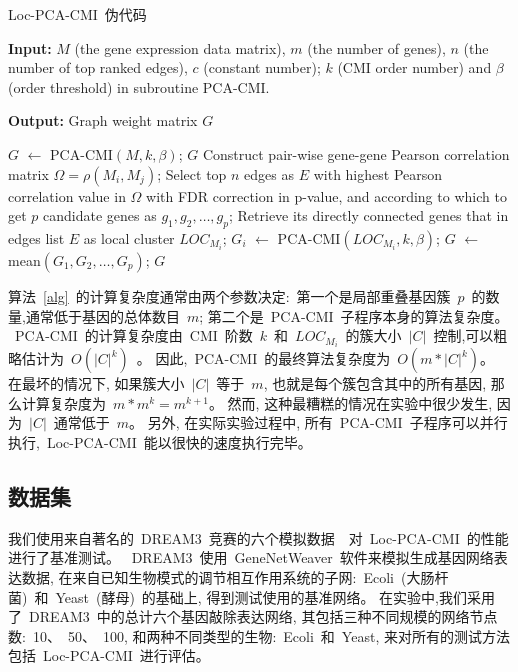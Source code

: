 \begin{algorithm}[!htbp]
    \caption{Loc-PCA-CMI~伪代码} %
    \label{alg}
    {\bf Input:} %
    $M$ (the gene expression data matrix), $m$ (the number of genes), $n$ (the number of top ranked edges), $c$ (constant number); $k$ (CMI order number) and $\beta$ (order threshold) in subroutine PCA-CMI.
    
    {\bf Output:} %
    Graph weight matrix $G$ 
    \begin{algorithmic}[1]
    \State $G$ $\leftarrow$ PCA-CMI$(M, k, \beta)$;
    \State \Return $G$
    \Else
    \State Construct pair-wise gene-gene Pearson correlation matrix $\Omega = \rho(M_i, M_j)$;
    \State Select top $n$ edges as $E$ with highest Pearson correlation value in $\Omega$ with FDR correction in p-value, and according to which to get 
    $p$ candidate genes as $g_1,g_2,\ldots,g_{p}$;
      \State Retrieve its directly connected genes that in edges list $E$ as local cluster $LOC_{M_i}$;
    \EndFor
      \State $G_{i}$ $\leftarrow$ PCA-CMI$(LOC_{M_i}, k, \beta)$;
    \EndFor
    \State $G$ $\leftarrow$ mean$(G_{1},G_{2},\ldots,G_{p})$;
    \State \Return $G$
    \EndIf
    \end{algorithmic}
\end{algorithm}

算法~\ref{alg}~的计算复杂度通常由两个参数决定:~第一个是局部重叠基因簇~$p$~的数量,通常低于基因的总体数目~$m$; 第二个是~PCA-CMI~子程序本身的算法复杂度。
~PCA-CMI~的计算复杂度由~CMI~阶数~$k$~和~$LOC_{M_i}$~的簇大小~$|C|$~控制,可以粗略估计为~$O(|C|^k)$~。
因此,~PCA-CMI~的最终算法复杂度为~$O(m *|C|^k)$。
在最坏的情况下, 如果簇大小~$|C|$~等于~$m$, 也就是每个簇包含其中的所有基因, 那么计算复杂度为~$m*m^k = m^{k+1}$。 
然而, 这种最糟糕的情况在实验中很少发生, 因为~$|C|$~通常低于~$m$。
另外, 在实际实验过程中, 所有~PCA-CMI~子程序可以并行执行,~Loc-PCA-CMI~能以很快的速度执行完毕。

\subsection{数据集}

我们使用来自著名的~DREAM3~竞赛的六个模拟数据~\cite{schaffter2011genenetweaver}~对~Loc-PCA-CMI~的性能进行了基准测试。
~DREAM3~使用~GeneNetWeaver~软件来模拟生成基因网络表达数据,
在来自已知生物模式的调节相互作用系统的子网:~Ecoli~(大肠杆菌)~和~Yeast~(酵母)~的基础上,
得到测试使用的基准网络。 
在实验中,我们采用了~DREAM3~中的总计六个基因敲除表达网络,
其包括三种不同规模的网络节点数:~10、~50、~100, 和两种不同类型的生物:~Ecoli~和~Yeast, 来对所有的测试方法包括~Loc-PCA-CMI~进行评估。

